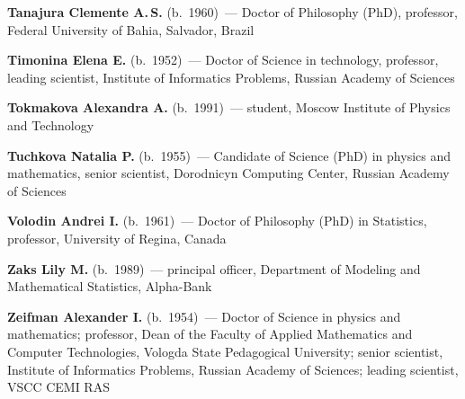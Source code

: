 \begin{multicols}{2}
\noindent
\textbf{Tanajura Clemente A.\,S.}  (b.\ 1960)~--- Doctor of Philosophy (PhD), professor, 
Federal University of Bahia, Salvador, Brazil

\vspace*{4pt}

\noindent
\textbf{Timonina Elena E.} (b.\ 1952)~--- Doctor of Science in technology, professor,
leading scientist, Institute of Informatics Problems,  Russian Academy of Sciences

\vspace*{4pt}

\noindent
\textbf{Tokmakova Alexandra A.} (b.\ 1991)~--- student, Moscow Institute of
Physics and Technology

\columnbreak

\noindent
\textbf{Tuchkova Natalia P.} (b.\ 1955)~--- Candidate of Science (PhD) 
in physics and mathematics, senior scientist, Dorodnicyn Computing Center, 
Russian Academy of Sciences

\vspace*{4pt}

\noindent
\textbf{Volodin Andrei I.} (b.\ 1961)~--- Doctor of Philosophy (PhD)
in Statistics, professor, University of Regina, Canada


\vspace*{4pt}


\noindent
\textbf{Zaks Lily M.} (b.\ 1989)~--- principal officer, Department of Modeling and 
Mathematical Statistics, Alpha-Bank


\vspace*{4pt}

\noindent
\textbf{Zeifman Alexander I.} (b.\ 1954)~--- Doctor of Science in physics 
and mathematics; professor, Dean of the Faculty of Applied Mathematics and Computer Technologies,
Vologda State Pedagogical University; senior scientist,
Institute of Informatics Problems, Russian Academy of Sciences;
leading scientist, VSCC CEMI RAS  



\def\leftfootline{\small{\textbf{\thepage}
\hfill ИНФОРМАТИКА И ЕЁ ПРИМЕНЕНИЯ\ \ \ том~6\ \ \ выпуск~4\ \ \ 2012}
}%
 \def\rightfootline{\small{ИНФОРМАТИКА И ЕЁ ПРИМЕНЕНИЯ\ \ \ том~6\ \ \ выпуск~4\ \ \ 2012
\hfill \textbf{\thepage}}}



\end{multicols}
\newpage